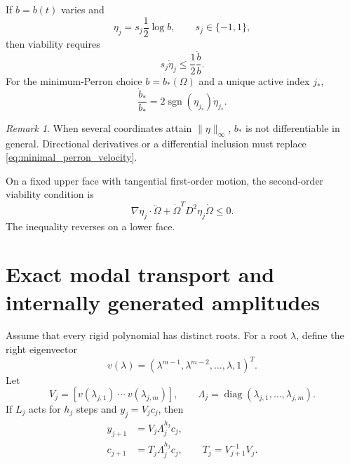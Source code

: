 \documentclass[11pt]{amsart}
\numberwithin{equation}{section}
\theoremstyle{plain}
\theoremstyle{definition}
\theoremstyle{remark}
\newtheorem{remark}[theorem]{Remark}
\begin{document}
If $b=b(t)$ varies and
\begin{equation}
\eta_j=s_j\frac12\log b,
\qquad s_j\in\{-1,1\},
\label{eq:moving_active_face}
\end{equation}
then viability requires
\begin{equation}
s_j\dot\eta_j
\leq\frac12\frac{\dot b}{b}.
\label{eq:moving_face_velocity}
\end{equation}
For the minimum-Perron choice $b=b_*(\Omega)$ and a unique active index $j_*$,
\begin{equation}
\frac{\dot b_*}{b_*}
=2\operatorname{sgn}(\eta_{j_*})\dot\eta_{j_*}.
\label{eq:minimal_perron_velocity}
\end{equation}

\begin{remark}
\label{rem:tied_active_indices}
When several coordinates attain $\|\eta\|_\infty$, $b_*$ is not differentiable in general.  Directional derivatives or a differential inclusion must replace \eqref{eq:minimal_perron_velocity}.
\end{remark}

On a fixed upper face with tangential first-order motion, the second-order viability condition is
\begin{equation}
\nabla\eta_j\cdot\ddot\Omega
+
\dot\Omega^TD^2\eta_j\dot\Omega
\leq0.
\label{eq:upper_face_acceleration}
\end{equation}
The inequality reverses on a lower face.

\section{Exact modal transport and internally generated amplitudes}
\label{sec:modal_transport}

Assume that every rigid polynomial has distinct roots.  For a root $\lambda$, define the right eigenvector
\begin{equation}
v(\lambda)
=(\lambda^{m-1},\lambda^{m-2},\ldots,\lambda,1)^T.
\label{eq:companion_eigenvector}
\end{equation}
Let
\begin{equation}
V_j=
\left[
v(\lambda_{j,1})\ \cdots\ v(\lambda_{j,m})
\right],
\qquad
\Lambda_j=\operatorname{diag}(\lambda_{j,1},\ldots,\lambda_{j,m}).
\label{eq:modal_matrices}
\end{equation}
If $L_j$ acts for $h_j$ steps and $y_j=V_jc_j$, then
\begin{align}
y_{j+1}
&=V_j\Lambda_j^{h_j}c_j,
\label{eq:window_state_handoff}\\
c_{j+1}
&=T_j\Lambda_j^{h_j}c_j,
\qquad
T_j=V_{j+1}^{-1}V_j.
\label{eq:modal_transport}
\end{align}
\end{document}
